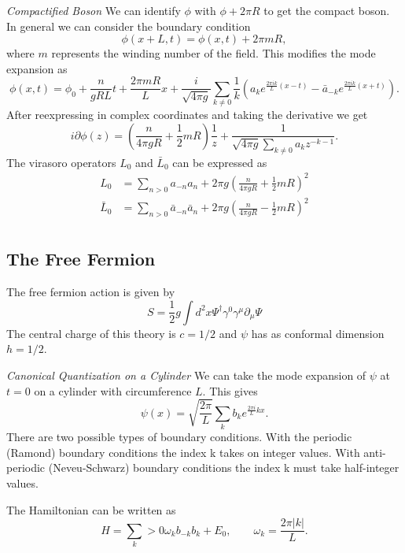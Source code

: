 \documentclass[submission, PhysLectNotes]{SciPost}
\begin{document}
{\it Compactified Boson}
We can identify $\phi$ with $\phi+2\pi R$ to get the compact boson. In general we can consider the boundary condition
\begin{equation}
  \phi(x+L,t) = \phi(x,t) + 2\pi m R,
\end{equation}
where $m$ represents the winding number of the field. This modifies the mode expansion as
\begin{equation}
  \phi(x,t) = \phi_0 + \frac{n}{gRL}t + \frac{2\pi m R}{L}x + \frac{i}{\sqrt{4\pi g}}\sum_{k\neq 0}\frac{1}{k}\left(a_ke^{\frac{2\pi i k}{L}(x-t)}-\bar{a}_{-k}e^{\frac{2\pi i k}{L}(x+t)}\right).
\end{equation}
After reexpressing in complex coordinates and taking the derivative we get
\begin{equation}
  i\partial\phi(z) = (\frac{n}{4\pi g R}+\frac{1}{2}mR)\frac{1}{z}+\frac{1}{\sqrt{4\pi g}\sum_{k\neq 0}a_k z^{-k-1}}.
\end{equation}
The virasoro operators $L_0$ and $\bar{L}_0$ can be expressed as
\begin{align}
  L_0 &= \sum_{n>0}a_{-n}a_n + 2\pi g \left(\frac{n}{4\pi g R}+\frac{1}{2}mR\right)^2\\
  \bar{L}_0 &= \sum_{n>0}\bar{a}_{-n}\bar{a}_n + 2\pi g \left(\frac{n}{4\pi g R}-\frac{1}{2}mR\right)^2\\
\end{align}
\subsection{The Free Fermion}
The free fermion action is given by
\begin{equation}
  S = \frac{1}{2}g\int d^2 x \Psi^\dagger\gamma^0\gamma^\mu\partial_\mu\Psi
\end{equation}
The central charge of this theory is $c=1/2$ and $\psi$ has as conformal dimension $h=1/2$.

{\it Canonical Quantization on a Cylinder}
We can take the mode expansion of $\psi$ at $t=0$ on a cylinder with circumference $L$. This gives
\begin{equation}
  \psi(x) = \sqrt{\frac{2\pi}{L}}\sum_kb_ke^{\frac{2\pi i}{L}k x}.
\end{equation}
There are two possible types of boundary conditions. With the periodic (Ramond) boundary conditions the index k takes on integer values. With anti-periodic (Neveu-Schwarz) boundary conditions the index k must take half-integer values.

The Hamiltonian can be written as
\begin{equation}
  H = \sum_k>0\omega_k b_{-k}b_k +E_0, \qquad \omega_k = \frac{2\pi\lvert k\rvert}{L}.
\end{equation}
\end{document}
